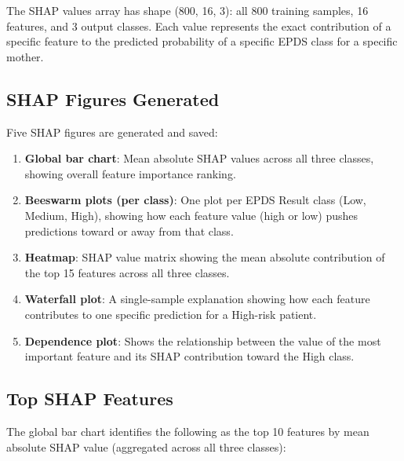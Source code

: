 The SHAP values array has shape (800, 16, 3): all 800 training samples, 16 features, and 3 output classes. Each value represents the exact contribution of a specific feature to the predicted probability of a specific EPDS class for a specific mother.

\subsection{SHAP Figures Generated}

Five SHAP figures are generated and saved:

\begin{enumerate}
    \item \textbf{Global bar chart}: Mean absolute SHAP values across all three classes, showing overall feature importance ranking.
    \item \textbf{Beeswarm plots (per class)}: One plot per EPDS Result class (Low, Medium, High), showing how each feature value (high or low) pushes predictions toward or away from that class.
    \item \textbf{Heatmap}: SHAP value matrix showing the mean absolute contribution of the top 15 features across all three classes.
    \item \textbf{Waterfall plot}: A single-sample explanation showing how each feature contributes to one specific prediction for a High-risk patient.
    \item \textbf{Dependence plot}: Shows the relationship between the value of the most important feature and its SHAP contribution toward the High class.
\end{enumerate}

\subsection{Top SHAP Features}

The global bar chart identifies the following as the top 10 features by mean absolute SHAP value (aggregated across all three classes):

